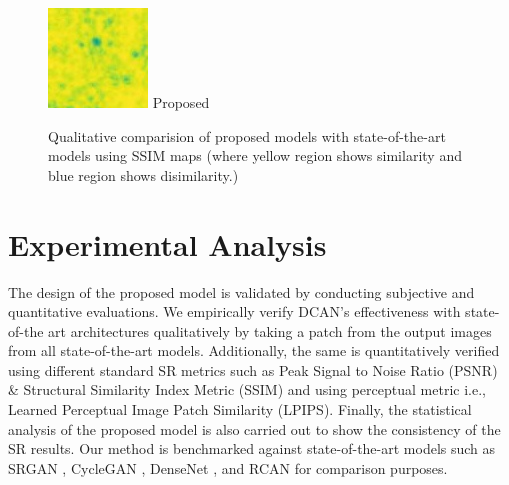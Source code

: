 \documentclass[conference]{IEEEtran}
\begin{document}
\begin{figure}[!t]
        \vfill
        \includegraphics[width=\linewidth]{Figures/983/983_proposed_ssim.jpg}
        Proposed
    \endminipage\hfill
    \caption{Qualitative comparision of proposed models with state-of-the-art models using SSIM maps (where yellow region shows similarity and blue region shows disimilarity.)}
    \label{fig:qualanal}
\end{figure}

\section{Experimental Analysis}
The design of the proposed model is validated by conducting subjective and quantitative evaluations. We empirically verify DCAN’s effectiveness %
with state-of-the art architectures qualitatively by taking a patch from the output images from all state-of-the-art models. Additionally, the same is quantitatively verified using different standard SR metrics such as Peak Signal to Noise Ratio (PSNR) \& Structural Similarity Index Metric (SSIM) and using perceptual metric i.e., Learned Perceptual Image Patch Similarity (LPIPS).  Finally, the statistical analysis of the proposed model is also carried out to show the consistency of the SR results. Our method is benchmarked against state-of-the-art models such as SRGAN \cite{SRGAN}, CycleGAN \cite{CycleGAN}, DenseNet \cite{SRDensenet}, and RCAN \cite{RCAN} for comparison purposes.  
\end{document}
